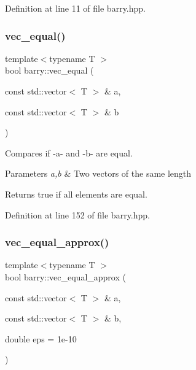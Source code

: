 Definition at line 11 of file barry.\+hpp.

\mbox{\label{namespacebarry_afbdb85734a7793890ea4268ea114858e}} 
\subsubsection{\texorpdfstring{vec\+\_\+equal()}{vec\_equal()}}
{\footnotesize\ttfamily template$<$typename T $>$ \\
bool barry\+::vec\+\_\+equal (\begin{DoxyParamCaption}\item[{const std\+::vector$<$ T $>$ \&}]{a,  }\item[{const std\+::vector$<$ T $>$ \&}]{b }\end{DoxyParamCaption})\hspace{0.3cm}{\ttfamily [inline]}}



Compares if -\/a-\/ and -\/b-\/ are equal. 


\begin{DoxyParams}{Parameters}
{\em a,b} & Two vectors of the same length \\
\hline
\end{DoxyParams}
\begin{DoxyReturn}{Returns}
{\ttfamily true} if all elements are equal. 
\end{DoxyReturn}


Definition at line 152 of file barry.\+hpp.

\mbox{\label{namespacebarry_a24c4bd4a99dd82edf66c2d3b645dca08}} 
\subsubsection{\texorpdfstring{vec\+\_\+equal\+\_\+approx()}{vec\_equal\_approx()}}
{\footnotesize\ttfamily template$<$typename T $>$ \\
bool barry\+::vec\+\_\+equal\+\_\+approx (\begin{DoxyParamCaption}\item[{const std\+::vector$<$ T $>$ \&}]{a,  }\item[{const std\+::vector$<$ T $>$ \&}]{b,  }\item[{double}]{eps = {\ttfamily 1e-\/10} }\end{DoxyParamCaption})\hspace{0.3cm}{\ttfamily [inline]}}



